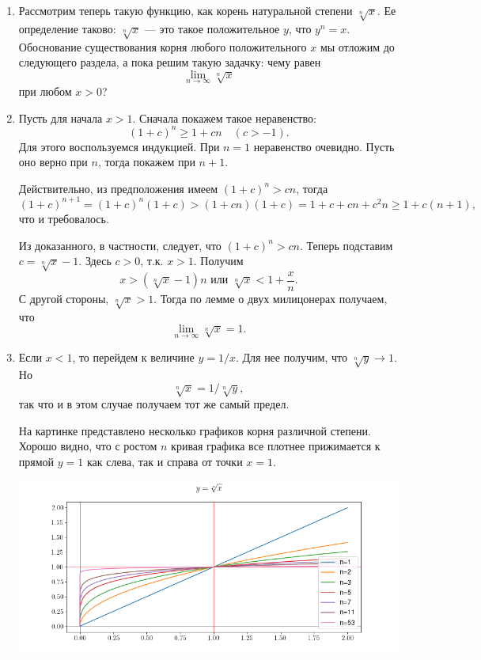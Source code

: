 \begin{enumerate}
\item Рассмотрим теперь такую функцию, как корень натуральной степени $\sqrt[n]{x}$. Ее определение таково: $\sqrt[n]{x}$ --- это такое положительное $y$, что $y^n=x$. Обоснование существования корня любого положительного $x$ мы отложим до следующего раздела, а пока решим такую задачку: чему равен 
$$
\lim_{n\to \infty}\sqrt[n]{x}
$$
при любом $x>0$?
\item Пусть для начала $x>1$. Сначала покажем такое неравенство:
$$
(1+c)^n\ge 1+cn\quad(c>-1).
$$
Для этого воспользуемся индукцией. При $n=1$ неравенство очевидно. Пусть оно верно при $n$, тогда покажем при $n+1$.

Действительно, из предположения имеем $(1+c)^n>cn$, тогда
$$
(1+c)^{n+1}=(1+c)^n(1+c)>(1+cn)(1+c)=1+c+cn+c^2n\ge 1+c(n+1),
$$
что и требовалось.

Из доказанного, в частности, следует, что $(1+c)^n>cn$. Теперь подставим $c=\sqrt[n]{x}-1$. Здесь $c>0$, т.к. $x>1$. Получим
$$
x>(\sqrt[n]{x}-1)n\mbox{ или }\sqrt[n]{x}<1+\frac xn.
$$
С другой стороны, $\sqrt[n]{x}>1$. Тогда по лемме о двух милицонерах получаем, что
$$
\lim_{n\to \infty}\sqrt[n]{x}=1.
$$

\item Если $x<1$, то перейдем к величине $y=1/x$. Для нее получим, что $\sqrt[n]{y}\to 1$. Но
$$
\sqrt[n]{x}=1/\sqrt[n]{y},
$$
так что и в этом случае получаем тот же самый предел.

На картинке представлено несколько графиков корня различной степени. Хорошо видно, что с ростом $n$ кривая графика все плотнее прижимается к прямой $y=1$ как слева, так и справа от точки $x=1$.
\begin{center}
\includegraphics[scale=0.5]{root.png}
\end{center}





\end{enumerate}
